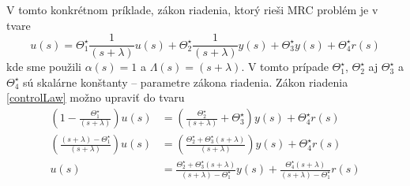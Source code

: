 \documentclass[a4paper, 10pt, ]{article}
\begin{document}
V tomto konkrétnom príklade, zákon riadenia, ktorý rieši MRC problém je v tvare
\begin{equation} \label{controlLaw}
	u(s) = \Theta_1^\star \frac{1}{(s + \lambda)} u(s) + \Theta_2^\star \frac{1}{(s + \lambda)} y(s) + \Theta_3^\star y(s) + \Theta_4^\star r(s)
\end{equation}
kde sme použili $\alpha(s) = 1$ a $\Lambda(s) = (s + \lambda)$. V tomto prípade $\Theta_1^\star$, $\Theta_2^\star$ aj $\Theta_3^\star$ a $\Theta_4^\star$ sú skalárne konštanty -- parametre zákona riadenia.
Zákon riadenia \eqref{controlLaw} možno upraviť do tvaru
\begin{subequations}
	\begin{align}
		\left( 1 - \frac{ \Theta_1^\star }{ (s + \lambda)} \right) u(s)
		&=
		\left( \frac{ \Theta_2^\star }{ (s + \lambda)} + \Theta_3^\star \right) y(s) + \Theta_4^\star r(s)
		\\
        \left( \frac{ (s + \lambda) - \Theta_1^\star }{ (s + \lambda)} \right) u(s)
		& =
		\left( \frac{ \Theta_2^\star + \Theta_3^\star (s + \lambda) }{ (s + \lambda)} \right) y(s) + \Theta_4^\star r(s)
		\\
		\label{controlLaw04_2}
		u(s) &= \frac{\Theta_2^\star + \Theta_3^\star (s + \lambda)}{(s + \lambda) - \Theta_1^\star} y(s) + \frac{ \Theta_4^\star (s + \lambda)}{(s + \lambda) - \Theta_1^\star} r(s)
	\end{align}
\end{subequations}
\end{document}
